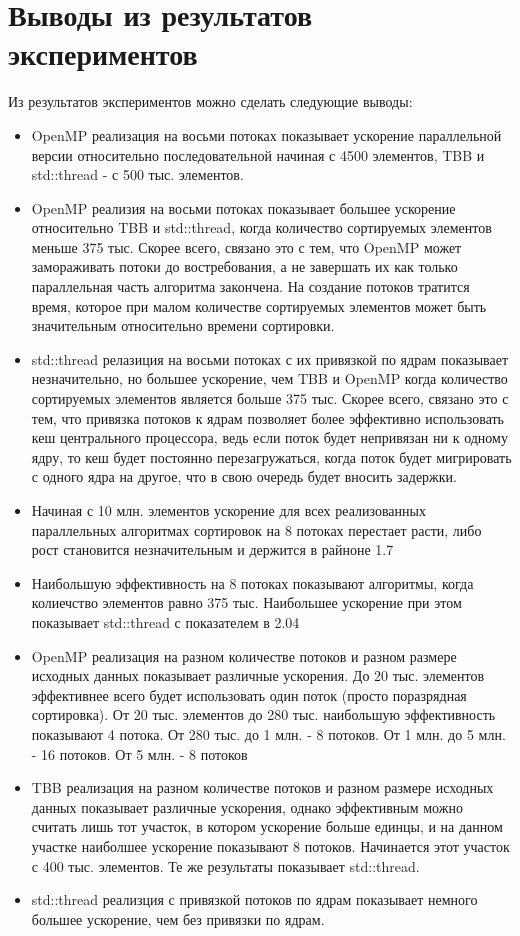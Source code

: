 \documentclass{report}
\begin{document}
\section*{Выводы из результатов экспериментов}
\par Из результатов экспериментов можно сделать следующие выводы:
\begin{itemize}
    \item OpenMP реализация на восьми потоках показывает ускорение параллельной версии относительно последовательной начиная с 4500 элементов, TBB и std::thread - с 500 тыс. элементов. 
    \item OpenMP реализия на восьми потоках показывает большее ускорение относительно TBB и std::thread, когда количество сортируемых элементов меньше 375 тыс. Скорее всего, связано это с тем, что OpenMP может замораживать потоки до востребования, а не завершать их как только параллельная часть алгоритма закончена. На создание потоков тратится время, которое при малом количестве сортируемых элементов может быть значительным относительно времени сортировки.
    \item std::thread релазиция на восьми потоках с их привязкой по ядрам показывает незначительно, но большее ускорение, чем TBB и OpenMP когда количество сортируемых элементов является больше 375 тыс. Скорее всего, связано это с тем, что привязка потоков к ядрам позволяет более эффективно использовать кеш центрального процессора, ведь если поток будет непривязан ни к одному ядру, то кеш будет постоянно перезагружаться, когда поток будет мигрировать с одного ядра на другое, что в свою очередь будет вносить задержки.
    \item Начиная с 10 млн. элементов ускорение для всех реализованных параллельных алгоритмах сортировок на 8 потоках перестает расти, либо рост становится незначительным и держится в райноне 1.7
    \item Наибольшую эффективность на 8 потоках показывают алгоритмы, когда колиечство элементов равно 375 тыс. Наибольшее ускорение при этом показывает std::thread с показателем в 2.04
    \item OpenMP реализация на разном количестве потоков и разном размере исходных данных показывает различные ускорения. До 20 тыс. элементов эффективнее всего будет использовать один поток (просто поразрядная сортировка). От 20 тыс. элементов до 280 тыс. наибольшую эффективность показывают 4 потока. От 280 тыс. до 1 млн. - 8 потоков. От 1 млн. до 5 млн. - 16 потоков. От 5 млн. - 8 потоков
    \item TBB реализация на разном количестве потоков и разном размере исходных данных показывает различные ускорения, однако эффективным можно считать лишь тот участок, в котором ускорение больше единцы, и на данном участке наиболшее ускорение показывают 8 потоков. Начинается этот участок с 400 тыс. элементов. Те же результаты показывает std::thread.
    \item std::thread реализция с привязкой потоков по ядрам показывает немного большее ускорение, чем без привязки по ядрам.
\end{itemize}
\end{document}

